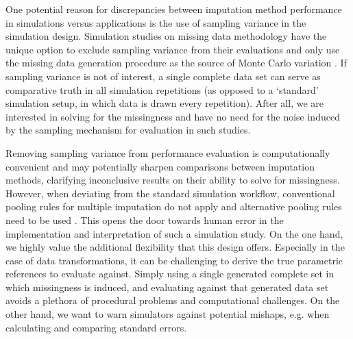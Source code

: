 \documentclass[bimj,fleqn]{w-art}
\begin{document}
One potential reason for discrepancies between imputation method performance in simulations versus applications is the use of sampling variance in the simulation design. Simulation studies on missing data methodology have the unique option to exclude sampling variance from their evaluations and only use the missing data generation procedure as the source of Monte Carlo variation \citep{vink14}. If sampling variance is not of interest, a single complete data set can serve as comparative truth in all simulation repetitions (as opposed to a `standard' simulation setup, in which data is drawn every repetition). After all, we are interested in solving for the missingness and have no need for the noise induced by the sampling mechanism for evaluation in such studies. 

Removing sampling variance from performance evaluation is computationally convenient and may potentially sharpen comparisons between imputation methods, clarifying inconclusive results on their ability to solve for missingness. However, when deviating from the standard simulation workflow, conventional pooling rules for multiple imputation \citep[cf.][p. 76-77]{rubi87} do not apply and alternative pooling rules need to be used \citep{raghunathan2003multiple,vink14}. This opens the door towards human error in the implementation and interpretation of such a simulation study. On the one hand, we highly value the additional flexibility that this design offers. Especially in the case of data transformations, it can be challenging to derive the true parametric references to evaluate against. Simply using a single generated complete set in which missingness is induced, and evaluating against that generated data set avoids a plethora of procedural problems and computational challenges. On the other hand, we want to warn simulators against potential mishaps, e.g. when calculating and comparing standard errors.


\end{document}
